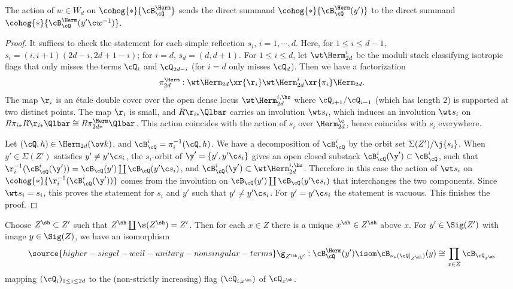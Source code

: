 \begin{lemma}
\notready\label{l:permute comp}
The action of $w\in W_{d}$ on $\cohog{*}{\cB^{\Herm}_{\cQ}}$ sends the direct summand $\cohog{*}{\cB^{\Herm}_{\cQ}(y')}$ to the direct summand $\cohog{*}{\cB^{\Herm}_{\cQ}(y'\c w^{-1})}$.
\end{lemma}
\begin{proof}
It suffices to check the statement for each simple reflection $s_{i}$, $i=1,\cdots, d$. Here, for $1\le i\le d-1$,  $s_{i}=(i,i+1)(2d-i,2d+1-i)$; for $i=d$, $s_{d}=(d,d+1)$. For $1\le i\le d$, let $\wt\Herm^{i}_{2d}$ be the moduli stack classifying isotropic flags that only misses the terms $\cQ_{i}$ and $\cQ_{2d-i}$ (for $i=d$ only misses $\cQ_{d}$). Then we have a factorization
\begin{equation*}
\pi^{\Herm}_{2d}: \wt\Herm_{2d}\xr{\r_{i}}\wt\Herm^{i}_{2d}\xr{\pi_{i}}\Herm_{2d}.
\end{equation*}
The map $\r_{i}$ is an \'etale double cover over the open dense locus  $\wt\Herm^{i,\hs}_{2d}$  where $\cQ_{i+1}/\cQ_{i-1}$ (which has length $2$) is supported at two distinct points. The map $\r_{i}$ is small, and $R\r_{i*}\Qlbar$ carries an involution $\wt s_{i}$, which induces an involution $\wt s_{i}$ on $R\pi_{i*}R\r_{i*}\Qlbar\cong R\pi^{\Herm}_{2d*}\Qlbar$. This action coincides with the action of $s_{i}$ over $\Herm_{2d}^{\c}$, hence coincides with $s_{i}$ everywhere.

Let $(\cQ,h)\in\Herm_{2d}(\ov k)$, and $\cB_{\cQ}^{i}=\pi_{i}^{-1}(\cQ,h)$. We have a decomposition of $\cB_{\cQ}^{i}$ by the orbit set $\Sigma(Z')/\j{s_{i}}$. When $y'\in\Sigma(Z')$ satisfies $y'\ne y'\c s_{i}$, the $s_{i}$-orbit of $\y'=\{y',y'\c s_{i}\}$ gives an open closed substack $\cB^{i}_{\cQ}(\y')\subset \cB_{\cQ}^{i}$, such that $\r^{-1}_{i}(\cB^{i}_{\cQ}(\y'))=\cB_{\cQ}(y')\coprod\cB_{\cQ}(y'\c s_{i})$, and $\cB^{i}_{\cQ}(\y')\subset \wt\Herm^{i,\hs}_{2d}$. Therefore in this case the action of $\wt s_{i}$ on $\cohog{*}{\r^{-1}_{i}(\cB^{i}_{\cQ}(\y'))}$ comes from the involution on $\cB_{\cQ}(y')\coprod\cB_{\cQ}(y'\c s_{i})$ that interchanges the two components. Since $\wt s_{i}=s_{i}$, this proves the statement for $s_{i}$ and $y'$ such that $y'\ne y'\c s_{i}$. For $y'=y'\c s_{i}$ the statement is vacuous. This finishes the proof.
\end{proof}






Choose $Z^{\sh}\subset Z'$ such that $Z^{\sh}\coprod\s(Z^{\sh})=Z'$. Then for each $x\in Z$ there is a unique $x^{\sh}\in Z^{\sh}$ above $x$. For  $y'\in \Sig(Z')$ with image $y\in \Sig(Z)$, we have an isomorphism
\begin{equation}\label{gZ}
\source{higher-siegel-weil-unitary-nonsingular-terms}
\g_{Z^{\sh}, y'}: \cB^{\Herm}_{\cQ}(y')\isom\cB_{\nu_{*}(\cQ|_{Z^{\sh}})}(y)\cong \prod_{x\in Z}\cB_{\cQ_{x^{\sh}}}
\end{equation}
mapping  $(\cQ_{i})_{1\le i\le 2d}$ to the (non-strictly increasing) flag  $(\cQ_{i,x^{\sh}})$ of $\cQ_{x^{\sh}}$.

